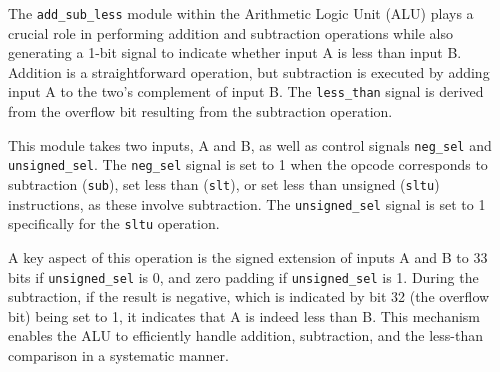 \documentclass[12pt,a4paper,oneside]{book} %
\begin{document}
The \texttt{add\_sub\_less} module within the Arithmetic Logic Unit (ALU) plays a crucial role in performing addition and subtraction operations while also generating a 1-bit signal to indicate whether input A is less than input B. Addition is a straightforward operation, but subtraction is executed by adding input A to the two's complement of input B. The \texttt{less\_than} signal is derived from the overflow bit resulting from the subtraction operation.

This module takes two inputs, A and B, as well as control signals \texttt{neg\_sel} and \texttt{unsigned\_sel}. The \texttt{neg\_sel} signal is set to 1 when the opcode corresponds to subtraction (\texttt{sub}), set less than (\texttt{slt}), or set less than unsigned (\texttt{sltu}) instructions, as these involve subtraction. The \texttt{unsigned\_sel} signal is set to 1 specifically for the \texttt{sltu} operation.

A key aspect of this operation is the signed extension of inputs A and B to 33 bits if \texttt{unsigned\_sel} is 0, and zero padding if \texttt{unsigned\_sel} is 1. During the subtraction, if the result is negative, which is indicated by bit 32 (the overflow bit) being set to 1, it indicates that A is indeed less than B. This mechanism enables the ALU to efficiently handle addition, subtraction, and the less-than comparison in a systematic manner.
\end{document}
